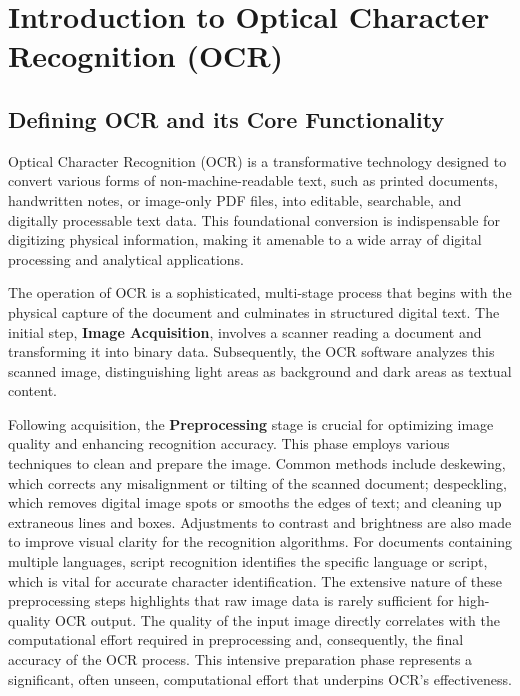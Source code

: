\section{Introduction to Optical Character Recognition (OCR)}

\subsection{Defining OCR and its Core Functionality}

Optical Character Recognition (OCR) is a transformative technology designed to convert various forms of non-machine-readable text, such as printed documents, handwritten notes, or image-only PDF files, into editable, searchable, and digitally processable text data. This foundational conversion is indispensable for digitizing physical information, making it amenable to a wide array of digital processing and analytical applications.

The operation of OCR is a sophisticated, multi-stage process that begins with the physical capture of the document and culminates in structured digital text. The initial step, \textbf{Image Acquisition}, involves a scanner reading a document and transforming it into binary data. Subsequently, the OCR software analyzes this scanned image, distinguishing light areas as background and dark areas as textual content.

Following acquisition, the \textbf{Preprocessing} stage is crucial for optimizing image quality and enhancing recognition accuracy. This phase employs various techniques to clean and prepare the image. Common methods include deskewing, which corrects any misalignment or tilting of the scanned document; despeckling, which removes digital image spots or smooths the edges of text; and cleaning up extraneous lines and boxes. Adjustments to contrast and brightness are also made to improve visual clarity for the recognition algorithms. For documents containing multiple languages, script recognition identifies the specific language or script, which is vital for accurate character identification. The extensive nature of these preprocessing steps highlights that raw image data is rarely sufficient for high-quality OCR output. The quality of the input image directly correlates with the computational effort required in preprocessing and, consequently, the final accuracy of the OCR process. This intensive preparation phase represents a significant, often unseen, computational effort that underpins OCR's effectiveness.


